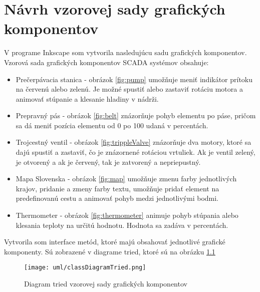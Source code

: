 \chapter{Návrh vzorovej sady grafických komponentov}

V programe Inkscape som vytvorila nasledujúcu sadu grafických komponentov. Vzorová sada grafických komponentov SCADA systémov obsahuje:
\begin{itemize}
	\item Prečerpávacia stanica - obrázok \ref{fig:pump} umožňuje meniť indikátor prítoku na červenú alebo zelenú. Je možné spustiť alebo zastaviť rotáciu motora a animovať stúpanie a klesanie hladiny v nádrži. 
	\item Prepravný pás - obrázok \ref{fig:belt} znázorňuje pohyb elementu po páse, pričom sa dá meniť pozícia elementu od 0 po 100 udaná v percentách. 
	\item Trojcestný ventil - obrázok \ref{fig:trippleValve} znázorňuje dva motory, ktoré sa dajú spustiť a zastaviť, čo je znázornené rotáciou vrtuliek. Ak je ventil zelený, je otvorený a ak je červený, tak je zatvorený a nepriepustný.   
	\item Mapa Slovenska - obrázok \ref{fig:map} umožňuje zmenu farby jednotlivých krajov, pridanie a zmeny farby textu, umožňuje pridať element na predefinovanú cestu a animovať pohyb medzi jednotlivými bodmi. 
	\item Thermometer - obrázok \ref{fig:thermometer} animuje pohyb stúpania alebo klesania teploty na určitú hodnotu. Hodnota sa zadáva v percentách. 
\end{itemize}

Vytvorila som interface metód, ktoré majú obsahovať jednotlivé grafické komponenty. Sú zobrazené v diagrame tried, ktoré sú na obrázku \ref{fig:classD}


\begin{figure}[hp]
	\centering
	\texttt{[image: uml/classDiagramTried.png]}
	\caption{Diagram tried vzorovej sady grafických komponentov}
	\label{fig:classD}
\end{figure}



